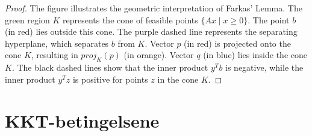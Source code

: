 \begin{proof}
	The figure illustrates the geometric interpretation of Farkas' Lemma. The green region \( K \) represents the cone of feasible points \( \{Ax \mid x \ge 0\} \). The point \( b \) (in red) lies outside this cone. The purple dashed line represents the separating hyperplane, which separates \( b \) from \( K \). Vector \( p \) (in red) is projected onto the cone \( K \), resulting in \( proj_K(p) \) (in orange). Vector \( q \) (in blue) lies inside the cone \( K \). The black dashed lines show that the inner product \( y^Tb \) is negative, while the inner product \( y^Tz \) is positive for points \( z \) in the cone \( K \).
\end{proof}

\section{KKT-betingelsene}
\label{sec:kkt_conditions}
